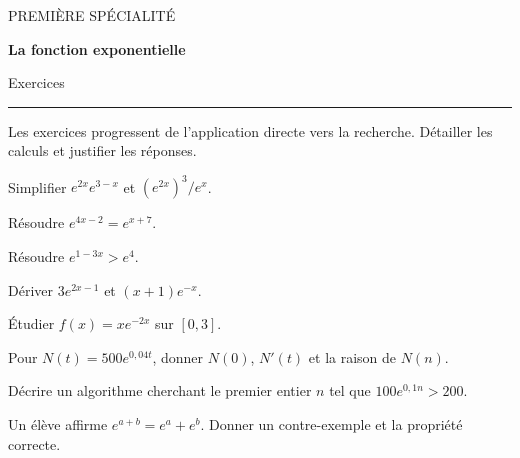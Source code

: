 \documentclass[11pt,a4paper]{article}
\begin{document}
{\small\color{Blue}PREMIÈRE SPÉCIALITÉ}\par{\LARGE\bfseries La fonction exponentielle}\par{\large Exercices}\par\vspace{0.2cm}\hrule\vspace{0.4cm}
Les exercices progressent de l’application directe vers la recherche. Détailler les calculs et justifier les réponses.
\par\noindent\begin{minipage}{\linewidth}
Simplifier $e^{2x}e^{3-x}$ et $(e^{2x})^3/e^x$.
\end{minipage}\par
\par\noindent\begin{minipage}{\linewidth}
Résoudre $e^{4x-2}=e^{x+7}$.
\end{minipage}\par
\par\noindent\begin{minipage}{\linewidth}
Résoudre $e^{1-3x}>e^4$.
\end{minipage}\par
\par\noindent\begin{minipage}{\linewidth}
Dériver $3e^{2x-1}$ et $(x+1)e^{-x}$.
\end{minipage}\par
\par\noindent\begin{minipage}{\linewidth}
Étudier $f(x)=x e^{-2x}$ sur $[0,3]$.
\end{minipage}\par
\par\noindent\begin{minipage}{\linewidth}
Pour $N(t)=500e^{0,04t}$, donner $N(0)$, $N\prime(t)$ et la raison de $N(n)$.
\end{minipage}\par
\par\noindent\begin{minipage}{\linewidth}
Décrire un algorithme cherchant le premier entier $n$ tel que $100e^{0,1n}>200$.
\end{minipage}\par
\par\noindent\begin{minipage}{\linewidth}
Un élève affirme $e^{a+b}=e^a+e^b$. Donner un contre-exemple et la propriété correcte.
\end{minipage}\par
\end{document}
